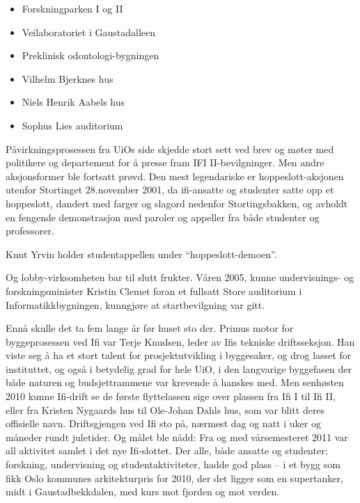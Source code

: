 \documentclass[../../main.tex]{subfiles}
\begin{document}
\begin{itemize}
	\item Forskningparken I og II
	\item Veilaboratoriet i Gaustadalleen
	\item Preklinisk odontologi-bygningen
	\item Vilhelm Bjerknes hus
	\item Niels Henrik Aabels hus
	\item Sophus Lies auditorium
\end{itemize}

Påvirkningsprosessen fra UiOs side skjedde stort sett ved brev og møter med politikere og departement for å presse fram IFI II-bevilgninger. Men andre aksjonsformer ble fortsatt prøvd. Den mest legendariske er hoppeslott-aksjonen utenfor Stortinget 28.november 2001, da ifi-ansatte og studenter satte opp et hoppeslott, dandert med farger og slagord nedenfor Stortingsbakken, og avholdt en fengende demonstrasjon med paroler og appeller fra både studenter og professorer.


Knut Yrvin holder studentappellen under ``hoppeslott-demoen''.

Og lobby-virksomheten bar til slutt frukter. Våren 2005, kunne undervisnings- og forskningsminister Kristin Clemet foran et fullsatt Store auditorium i Informatikkbygningen, kunngjøre at startbevilgning var gitt.

Ennå skulle det ta fem lange år før huset sto der. Primus motor for byggeprosessen ved Ifi var Terje Knudsen, leder av Ifis tekniske driftsseksjon. Han viste seg å ha et stort talent for prosjektutvikling i byggesaker, og drog lasset for instituttet, og også i betydelig grad for hele UiO, i den langvarige
byggefasen der både naturen og budsjettrammene var krevende å hanskes med. Men senhøsten 2010 kunne Ifi-drift se de første flyttelassen sige over plassen fra Ifi I til Ifi II, eller fra Kristen Nygaards hus til Ole-Johan Dahls hus, som var blitt deres offisielle navn. Driftsgjengen ved Ifi sto på,
nærmest dag og natt i uker og måneder rundt juletider. Og målet ble nådd: Fra og med vårsemesteret 2011 var all aktivitet samlet i det nye Ifi-slottet. Der alle, både ansatte og studenter; forskning, undervisning og studentaktiviteter, hadde god plass – i et bygg som fikk Oslo kommunes arkitekturpris for 2010, der det ligger som en supertanker, midt i Gaustadbekkdalen, med kurs mot fjorden og mot verden.
\end{document}

